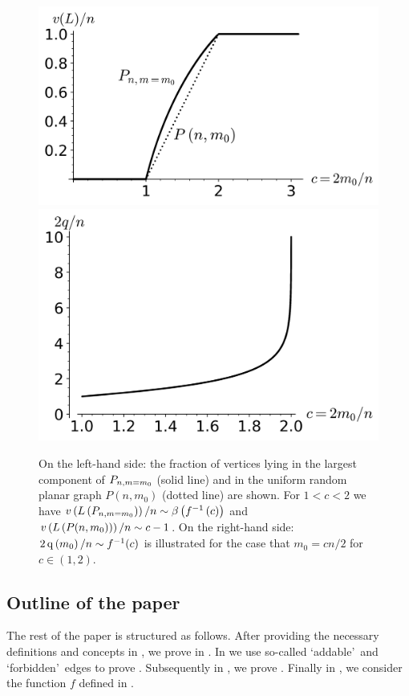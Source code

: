 \begin{figure}[t]
\centering
	\includegraphics[scale=0.535]{process-largest_component.png}
	\includegraphics[scale=0.465]{process-considered.png}
	\caption{On the left-hand side: the fraction of vertices lying in the largest component of $P_{n,m=m_0}$ (solid line) and in the uniform random planar graph $P(n,m_0)$ (dotted line) are shown. For $1<c<2$ we have $v\left({L\left(P_{n,m=m_0}\right)}\right)/n\sim \beta\left(f^{-1}\left(c\right)\right)$ and $v\left({L\left(P(n,m_0)\right)}\right)/n\sim c-1$. On the right-hand side: $2\operatorname{q}\left(m_0\right)/n\sim f^{-1}(c)$ is illustrated for the case that $m_0=cn/2$ for $c\in(1,2)$. }
	\label{PPfig:cv}
\end{figure}

\subsection{Outline of the paper}
The rest of the paper is structured as follows. After providing the necessary definitions and concepts in , we prove  in . In  we use so-called \lq addable\rq\ and \lq forbidden\rq\ edges to prove . Subsequently in , we prove . Finally in , we consider the function $f$ defined in .

